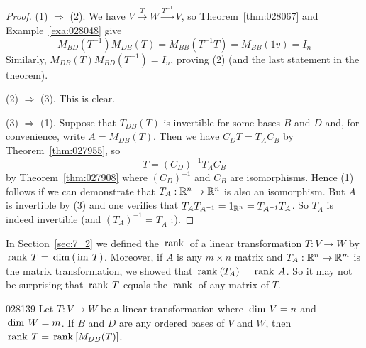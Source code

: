 \begin{proof}
(1) $\Rightarrow$ (2). We have $V \stackrel{T}{\to} W \stackrel{T^{-1}}{\to} V$, so Theorem~\ref{thm:028067} and Example~\ref{exa:028048} give
\begin{equation*}
M_{BD}(T^{-1})M_{DB}(T) = M_{BB}(T^{-1}T) = M_{BB}(1v) = I_n
\end{equation*}
Similarly, $M_{DB}(T)M_{BD}(T^{-1}) = I_{n}$, proving (2) (and the last statement in the theorem).


(2) $\Rightarrow$ (3). This is clear.

\begin{wrapfigure}{l}{4cm}
	\centering
	
\end{wrapfigure}
(3) $\Rightarrow$ (1). Suppose that $T_{DB}(T)$ is invertible for some bases $B$ and $D$ and, for convenience, write $A = M_{DB}(T)$. Then we have $C_{D}T = T_{A}C_{B}$ by Theorem~\ref{thm:027955}, so
\begin{equation*}
T = (C_D)^{-1}T_AC_B
\end{equation*}
by Theorem~\ref{thm:027908} where $(C_{D})^{-1}$ and $C_{B}$ are isomorphisms. Hence (1) follows if we can demonstrate that $T_{A} : \mathbb{R}^n \to \mathbb{R}^n$ is also an isomorphism. But $A$ is invertible by (3) and one verifies that $T_AT_{A^{-1}} = 1_{\mathbb{R}^n} = T_{A^{-1}}T_A$. So $T_{A}$ is indeed invertible (and $(T_{A})^{-1} = T_{A^{-1}}$).
\end{proof}

In Section~\ref{sec:7_2} we defined the $\thinspace\operatorname{rank\medspace}$ of a linear transformation $T : V \to W$ by $\thinspace\operatorname{rank \medspace}T = \thinspace\operatorname{dim\medspace}(\thinspace\operatorname{im \medspace}T)$. Moreover, if $A$ is any $m \times n$ matrix and $T_{A} : \mathbb{R}^n \to \mathbb{R}^m$ is the matrix transformation, we showed that $\thinspace\operatorname{rank\medspace}(T_{A}) = \thinspace\operatorname{rank \medspace}A$. So it may not be surprising that $\thinspace\operatorname{rank \medspace}T$ equals the $\thinspace\operatorname{rank\medspace}$ of any matrix of $T$.


\begin{theorem}{}{028139}
Let $T : V \to W$ be a linear transformation where $\thinspace\operatorname{dim \medspace}V = n$ and $\thinspace\operatorname{dim \medspace}W = m$. If $B$ and $D$ are any ordered bases of $V$ and $W$, then $\thinspace\operatorname{rank \medspace}T = \thinspace\operatorname{rank\medspace}[M_{DB}(T)]$.
\end{theorem}

